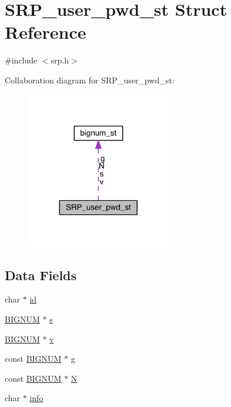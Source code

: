 \hypertarget{struct_s_r_p__user__pwd__st}{}\section{S\+R\+P\+\_\+user\+\_\+pwd\+\_\+st Struct Reference}
\label{struct_s_r_p__user__pwd__st}


{\ttfamily \#include $<$srp.\+h$>$}



Collaboration diagram for S\+R\+P\+\_\+user\+\_\+pwd\+\_\+st\+:\nopagebreak
\begin{figure}[H]
\begin{center}
\leavevmode
\includegraphics[width=179pt]{struct_s_r_p__user__pwd__st__coll__graph}
\end{center}
\end{figure}
\subsection*{Data Fields}
\begin{DoxyCompactItemize}
\item 
char $\ast$ \hyperlink{struct_s_r_p__user__pwd__st_a0478f7cd8e97b1656f1b7a03ced467c4}{id}
\item 
\hyperlink{crypto_2ossl__typ_8h_a6fb19728907ec6515e4bfb716bffa141}{B\+I\+G\+N\+UM} $\ast$ \hyperlink{struct_s_r_p__user__pwd__st_a174fa2d60f08e563a4405911f6c81172}{s}
\item 
\hyperlink{crypto_2ossl__typ_8h_a6fb19728907ec6515e4bfb716bffa141}{B\+I\+G\+N\+UM} $\ast$ \hyperlink{struct_s_r_p__user__pwd__st_a449bad7793a9afed36db8c4ef3a71a41}{v}
\item 
const \hyperlink{crypto_2ossl__typ_8h_a6fb19728907ec6515e4bfb716bffa141}{B\+I\+G\+N\+UM} $\ast$ \hyperlink{struct_s_r_p__user__pwd__st_a74911ab79e6547667d292a313b160902}{g}
\item 
const \hyperlink{crypto_2ossl__typ_8h_a6fb19728907ec6515e4bfb716bffa141}{B\+I\+G\+N\+UM} $\ast$ \hyperlink{struct_s_r_p__user__pwd__st_a7ffec2b8f3e6b6c546f4eebc6cae727c}{N}
\item 
char $\ast$ \hyperlink{struct_s_r_p__user__pwd__st_abd59b785f164cf0a2612687a73c5e81d}{info}
\end{DoxyCompactItemize}


